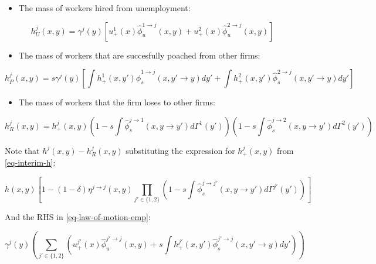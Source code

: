 \documentclass[
  letterpaper,
  DIV=11,
  numbers=noendperiod]{scrartcl}
\providecommand{\tightlist}{%
  \setlength{\itemsep}{0pt}\setlength{\parskip}{0pt}}\usepackage{longtable,booktabs,array}
\begin{document}
\begin{itemize}
\tightlist
\item
  The mass of workers hired from unemployment:
\end{itemize}

\begin{equation}
h^j_{U}(x,y) = \gamma^{j}(y)\left[u_{+}^{1}(x)\hat{\phi}_{u}^{1 \to j}(x,y) + u_{+}^{2}(x)\hat{\phi}_{u}^{2 \to j}(x,y) \right]
\end{equation}

\begin{itemize}
\tightlist
\item
  The mass of workers that are succesfully poached from other firms:
\end{itemize}

\begin{equation}
h^j_{P}(x,y) = s\gamma^{j}(y)\left[\int{ h_{+}^{1}(x,y') \hat{\phi}_{s}^{1 \to j}(x,y'\to y) dy'} + \int{ h_{+}^{2}(x,y') \hat{\phi}_{s}^{2 \to j}(x,y'\to y) dy'} \right]
\end{equation}

\begin{itemize}
\tightlist
\item
  The mass of workers that the firm loses to other firms:
\end{itemize}

\begin{equation}
h^j_{R}(x,y) =  h_{+}^{j}(x,y)\left(1 - s \int \hat{\phi}_{s}^{j\to 1}(x,y\to y')d\Gamma^{1}(y')\right) \left(1 - s \int \hat{\phi}_{s}^{j\to 2}(x,y\to y')d\Gamma^{2}(y')\right)
\end{equation}

Note that \(h^{j}(x,y) - h^{j}_{R}(x,y)\) substituting the expression
for \(h_{+}^j(x,y)\) from \eqref{eq-interim-h}:

\begin{equation}
h(x,y)\left[1 - (1-\delta)\eta^{j \to j}(x,y) \prod_{j' \in \{1,2\}}\left(1 - s \int \hat{\phi}_{s}^{j\to j'}(x,y\to y')d\Gamma^{j'}(y')\right) \right]
\end{equation}

And the RHS in \eqref{eq-law-of-motion-emp}:

\begin{equation}
 \gamma^{j}(y) \left(\sum_{j'\in\{1,2\}} \left( u_{+}^{j'}(x)\hat{\phi}_{u}^{j'\to j}(x,y) + s\int{ h_{+}^{j'}(x,y') \hat{\phi}_{s}^{j' \to j}(x,y'\to y) dy'} \right)\right)
\end{equation}
\end{document}
